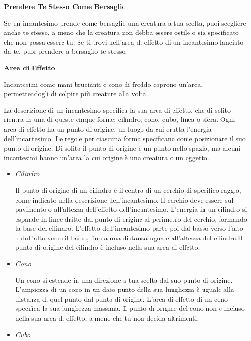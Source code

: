 \begin{multicols}{2}
\textbf{Prendere Te Stesso Come Bersaglio} 

Se un incantesimo prende come bersaglio una creatura a tua scelta, puoi scegliere anche te stesso, a meno che la creatura non debba essere ostile o sia specificato che non possa essere tu. Se ti trovi nell'area di effetto di un incantesimo lanciato da te, puoi prendere a bersaglio te stesso.

\medskip

\textbf{Aree di Effetto}

Incantesimi come mani brucianti e cono di freddo coprono un'area, permettendogli di colpire più creature alla volta.

La descrizione di un incantesimo specifica la sua area di effetto, che di solito rientra in una di queste cinque forme: cilindro, cono, cubo, linea o sfera. Ogni area di effetto ha un punto di origine, un luogo da cui erutta l'energia dell'incantesimo. Le regole per ciascuna forma specificano come posizionare il suo punto di origine. Di solito il punto di origine è un punto nello spazio, ma alcuni incantesimi hanno un'area la cui origine è una creatura o un oggetto.

\begin{itemize}
\item
\textit{Cilindro}

Il punto di origine di un cilindro è il centro di un cerchio di specifico raggio, come indicato nella descrizione dell'incantesimo. Il cerchio deve essere sul pavimento o all'altezza dell'effetto dell'incantesimo. L'energia in un cilindro si espande in linee dritte dal punto di origine al perimetro del cerchio, formando la base del cilindro. L'effetto dell'incantesimo parte poi dal basso verso l'alto o dall'alto verso il basso, fino a una distanza uguale all'altezza del cilindro.Il punto di origine del cilindro è incluso nella sua area di effetto.

\item

\textit{Cono}

Un cono si estende in una direzione a tua scelta dal suo punto di origine. L'ampiezza di un cono in un dato punto della sua lunghezza è uguale alla distanza di quel punto dal punto di origine. L'area di effetto di un cono specifica la sua lunghezza massima. Il punto di origine del cono non è incluso nella sua area di effetto, a meno che tu non decida altrimenti.

\item
\textit{Cubo}


\end{itemize}
\end{multicols}
